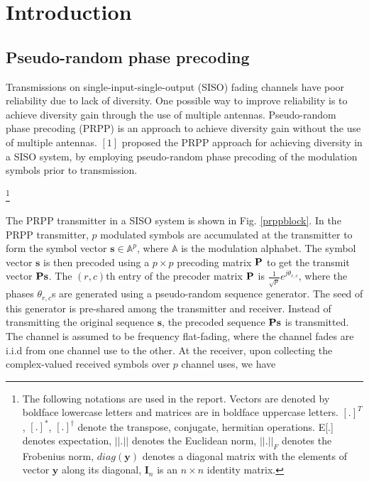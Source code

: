 \documentclass[11pt, onecolumn]{report}
\newcommand{\pp}{{\bf P}}
\newcommand{\sa}{{\mathbb A}}
\newcommand\blfootnote[1]{%
  \begingroup
  \renewcommand\thefootnote{}\footnote{#1}%
  \addtocounter{footnote}{-1}%
  \endgroup}
\begin{document}
\chapter{Introduction}

\section{Pseudo-random phase precoding}

 Transmissions on single-input-single-output (SISO) fading channels have poor reliability due to lack of diversity. One possible way to improve reliability is to achieve diversity gain through the use of multiple antennas. Pseudo-random phase precoding (PRPP) is an approach to achieve diversity gain without the use of multiple antennas. $[1]$ 
proposed the PRPP approach for achieving diversity in a SISO system, by employing pseudo-random phase precoding of the modulation symbols prior to transmission. 




\blfootnote{
The following notations are used in the report. Vectors are denoted by boldface lowercase letters and matrices are in boldface uppercase letters. $[.]^T$, $[.]^*$, $[.]^\dagger$ denote the transpose, conjugate, hermitian operations. E[.] denotes expectation, $||.||$ denotes the Euclidean norm, $||.||_F$ denotes the Frobenius norm,    $diag(\mathbf{y})$ denotes a diagonal matrix with the elements of vector $\mathbf{y}$ along its diagonal, $\mathbf{I}_n$ is an $n\times n$ identity matrix. }

The PRPP transmitter in a SISO system is shown in Fig. \ref{prppblock}. In the PRPP transmitter, $p$ modulated symbols are accumulated at the transmitter to form the symbol vector $\mathbf s \in \sa^p$, where $\mathbb A$ is the modulation alphabet. The symbol vector $\mathbf s$ is then  precoded using a $p \times p$ precoding matrix $\pp$  to get the transmit vector $\pp\mathbf s$. 
The $(r,c)$th entry of the precoder matrix $\pp$ is
$\frac{1}{\sqrt{p}}e^{j\theta_{r,c}}$, where the phases 
$\theta_{r,c}$s are generated using a pseudo-random sequence generator. The seed of this generator is pre-shared among the transmitter and 
receiver. Instead of transmitting the original sequence $\mathbf s$, the precoded sequence $\pp\mathbf s$ is transmitted. The channel is assumed to be frequency flat-fading, where the channel fades are i.i.d from one channel use to the other. At the receiver, upon collecting the complex-valued received symbols over $p$ channel uses, we have 
\end{document}
